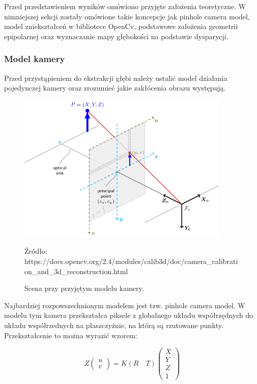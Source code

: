 \documentclass[oneside, eng]{mgr}
\begin{document}
Przed przedstawieniem wyników omówiono przyjęte założenia teoretyczne. W nimniejszej sekcji zostały omówione takie koncepcje jak pinhole camera model, model zniekształceń w bibliotece OpenCv, podstawowe założenia geometrii epipolarnej oraz wyznaczanie mapy głębokości na podstawie dysparycji.

\subsubsection{Model kamery}
Przed przystąpieniem do ekstrakcji głębi należy ustalić model działania pojedynczej kamery oraz zrozumieć jakie zakłócenia obrazu występują.

\begin{figure}
\centering
	\includegraphics[width=0.90\textwidth]{pinhole_camera_model.png}\par\vspace{1cm}
\caption{Scena przy przyjętym modelu kamery.}
Źródło: https://docs.opencv.org/2.4/modules/calib3d/doc/camera\_calibration\_and\_3d\_reconstruction.html
	\label{fig:camera_model}
\end{figure}

Najbardziej rozpowszechnionym modelem jest tzw. pinhole camera model. W modelu tym kamera przekształca piksele z globalnego układu współrzędnych do układu współrzednych na płaszczyźnie, na którą są rzutowane punkty. Przekształcenie to można wyrazić wzorem:

\begin{equation}
	Z
	\left( \begin{array}{l}
		u \\
		v 
	\end{array} \right) 
	= K (R \quad T) 
	\left( \begin{array}{l}
		X \\	Y \\	Z \\	1
	\end{array} \right) 
\end{equation}
\end{document}
